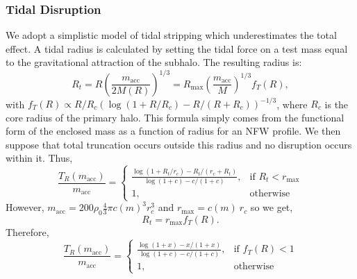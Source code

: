 \documentclass[usenatbib]{mnras}
\begin{document}
\subsubsection{Tidal Disruption} 

We adopt a simplistic model of tidal stripping which underestimates the total effect. A tidal radius is calculated by setting the tidal force on a test mass equal to the gravitational attraction of the subhalo. The resulting radius is:
\begin{equation}
R_t = R \left(\frac{m_{\text{acc}}}{2 M(R)}\right)^{1/3} =  R_{\text{max}} \left(\frac{m_{\text{acc}}}{M}\right)^{1/3} f_T(R), 
\end{equation} 
with $f_T(R) \propto R/R_c(\log(1+R/R_c) - R/(R+R_c))^{-1/3}$, where $R_c$ is the core radius of the primary halo. This formula simply comes from the functional form of the enclosed mass as a function of radius for an NFW profile. We then suppose that total truncation occurs outside this radius and no disruption occurs within it. Thus,
\begin{equation}
\frac{T_R(m_{\text{acc}})}{m_{\text{acc}}} = 
\begin{cases}
\frac{\log{(1+R_t/r_c)} - R_t/(r_c+R_t)}{\log{(1+c)} - c/(1+c)},
& \text{if } R_t < r_{\text{max}}
\\
    1,              & \text{otherwise}
\end{cases}
\end{equation} 
However, $m_{\text{acc}} = 200 \rho_0 \frac{4}{3} \pi c(m)^3 r_c^3$ and $r_{\text{max}} = c(m) \: r_{c}$ so we get,
\begin{equation}
R_t = r_{\text{max}} f_T(R).
\end{equation}
Therefore,
\begin{equation} \label{trunc}
\frac{T_R(m_{\text{acc}})}{m_{\text{acc}}} =
\begin{cases}
\frac{\log{(1 + x)} - x/(1 + x)}{\log{(1+c)} - c/(1+c)},& \text{if } f_T(R) < 1
\\
1, & \text{otherwise}
\end{cases}
\end{equation} 
\end{document}
